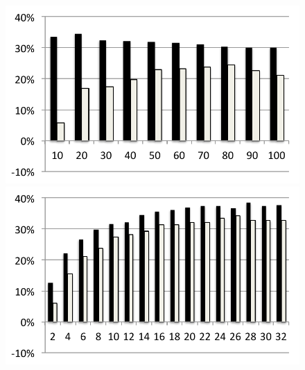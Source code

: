 \begin{figure}
  \includegraphics[width=\mywidth]{../../eval/32threads/case4it.pdf}\includegraphics[width=\mywidth]{../../eval/32threads/case4th.pdf}
\end{figure}

  \vspace{-0.8cm}\caption{\label{Fi:case1th}Apache(l: workload; r: conc)\vspace{-0.2cm}}
  \vspace{-0.8cm}\caption{\label{Fi:case2th} 
    (l: workload; r: conc)\vspace{-0.2cm}}
  \vspace{-0.8cm}\caption{\label{Fi:case3th}Flexive {\sf FxValueRendererFactory} 
			(l: workload; r: conc)\vspace{-0.2cm}}
  \vspace{-0.8cm}\caption{\label{Fi:case4th}Gridkit {\sf ReflectionPofSerializer}
    (l: workload; r: conc)\vspace{-0.2cm}}

